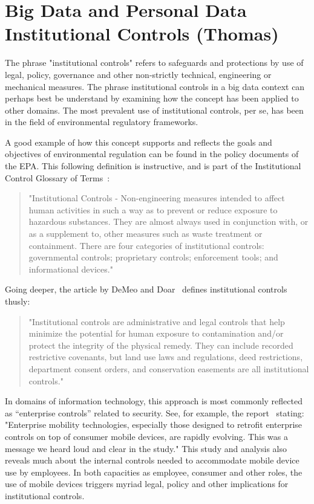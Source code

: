 \section{Big Data and Personal Data Institutional Controls (Thomas)}

The phrase "institutional controls" refers to safeguards and protections by use of legal, policy, governance and other non-strictly technical, engineering or mechanical measures.
The phrase institutional controls in a big data context can perhaps best be understand by examining how the concept has been applied to other domains.
The most prevalent use of institutional controls, per se, has been in the field of environmental regulatory frameworks.

A good example of how this concept supports and reflects the goals and objectives of environmental regulation can be found in the policy documents of the EPA.
This following definition is instructive, and is part of the Institutional Control Glossary of Terms~\cite{EPA2007}:
\begin{quote}
"Institutional Controls - Non-engineering measures intended to affect human activities in such a way as to prevent or reduce exposure to hazardous substances. They are almost always used in conjunction with, or as a supplement to, other measures such as waste treatment or containment. There are four categories of institutional controls: governmental controls; proprietary controls; enforcement tools; and informational devices."
\end{quote}

Going deeper, the article by DeMeo and Doar~\cite{DeMeo2011} defines institutional controls thusly:
\begin{quote}
"Institutional controls are administrative and legal controls that help minimize the potential for human exposure to contamination and/or protect the integrity of the physical remedy. They can include recorded restrictive covenants, but land use laws and regulations, deed restrictions, department consent orders, and conservation easements are all institutional controls."
\end{quote}

In domains of information technology, this approach is most commonly reflected as ``enterprise controls'' related to security.
See, for example, the report~\cite{Juniper2012}
stating: "Enterprise mobility technologies, especially those designed to retrofit enterprise controls on top of consumer mobile devices, are rapidly evolving. This was a message we heard loud and clear in the study."
This study and analysis also reveals much about the internal controls needed to accommodate mobile device use by employees.
In both capacities as employee, consumer and other roles, the use of mobile devices triggers myriad legal, policy and other implications for institutional controls.

